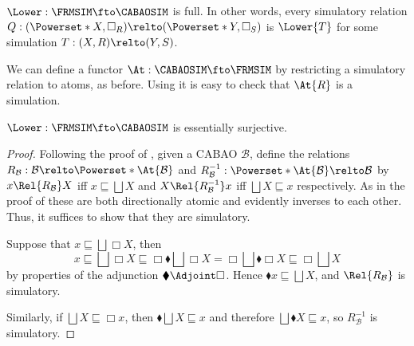 \begin{lemma}
  \label{lemma:lower-frmsim-full}
  \(\Lower : \FRMSIM \fto \CABAOSIM\) is full. In other words, every simulatory
  relation
  \(Q : (\Powerset*{X}, \Box_R) \relto (\Powerset*{Y}, \Box_S)\)
  is \(\Lower{T}\) for some simulation \(T : (X, R) \relto (Y, S)\).
\end{lemma}

We can define a functor \(\At : \CABAOSIM \fto \FRMSIM\) by
restricting a simulatory relation to atoms, as before. Using
 it is easy to check that \(\At{R}\) is a
simulation.

\begin{lemma}
  \label{lemma:lower-frmsim-dense}
  \(\Lower : \FRMSIM \fto \CABAOSIM\) is essentially surjective.
\end{lemma}
\begin{proof}
  Following the proof of ,
  given a CABAO \(\mathcal{B}\), define the relations
  \(R_{\mathcal{B}} : \mathcal{B} \relto \Powerset*{\At{\mathcal{B}}}\) and
  \(R_{\mathcal{B}}^{-1} : \Powerset*{\At{\mathcal{B}}} \relto \mathcal{B}\)
  by
  \(x \Rel{R_{\mathcal{B}}} X\) iff \(x \sqsubseteq \bigsqcup X\)
  and
  \(X \Rel{R^{-1}_{\mathcal{B}}} x\) iff \(\bigsqcup X \sqsubseteq x\)
  respectively.
  As in the proof of  these are both directionally
  atomic and evidently inverses to each other. Thus, it suffices to show that
  they are simulatory.

  Suppose that \(x \sqsubseteq \bigsqcup \Box X\), then
  \[
    x
    \sqsubseteq \bigsqcup \Box X
    \sqsubseteq \Box \blacklozenge \bigsqcup \Box X
    = \Box \bigsqcup \blacklozenge \Box X
    \sqsubseteq \Box \bigsqcup X
  \]
  by properties of the adjunction $\blacklozenge \Adjoint \Box$.
  Hence $\blacklozenge x \sqsubseteq \bigsqcup X$, and $\Rel{R_\mathcal{B}}$ is
  simulatory.

  Similarly, if \(\bigsqcup X \sqsubseteq \Box x\), then \(\blacklozenge
  \bigsqcup X \sqsubseteq x\) and therefore \(\bigsqcup \blacklozenge X
  \sqsubseteq x\), so \(R_{\mathcal{B}}^{-1}\) is simulatory.
\end{proof}

